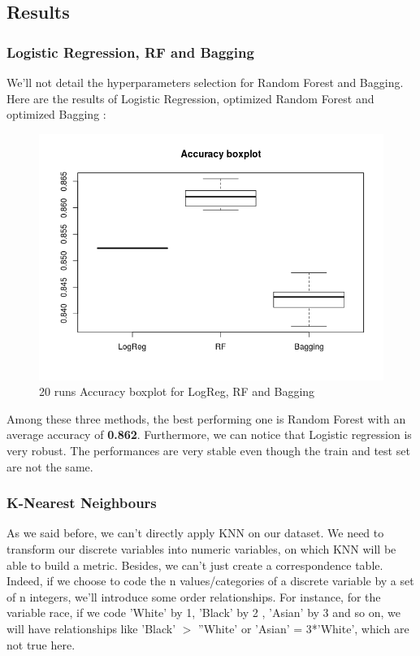 \documentclass[11pt]{article}
\begin{document}
\subsection{Results}
\subsubsection{Logistic Regression, RF and Bagging}
We'll not detail the hyperparameters selection for Random Forest and Bagging. Here are the results of Logistic Regression, optimized Random Forest and optimized Bagging : 

\begin{figure}[!h]
\begin{center}
\includegraphics[scale=0.8]{images/accuracy_boxplot.png}

\end{center}
\caption{20 runs Accuracy boxplot for LogReg, RF and Bagging}
\end{figure}

Among these three methods, the best performing one is Random Forest with an average accuracy of \textbf{0.862}. Furthermore, we can notice that Logistic regression is very robust. The performances are very stable even though the train and test set are not the same.

\subsubsection{K-Nearest Neighbours}

As we said before, we can't directly apply KNN on our dataset. We need to transform our discrete variables into numeric variables, on which KNN will be able to build a metric. Besides, we can't just create a correspondence table. Indeed, if we choose to code the n values/categories of a discrete variable by a set of n integers, we'll introduce some order relationships. For instance, for the variable race, if we code 'White' by 1, 'Black' by 2 , 'Asian' by 3 and so on, we will have relationships like 'Black' $>$ ''White' or 'Asian' = 3*'White', which are not true here.  
\end{document}
